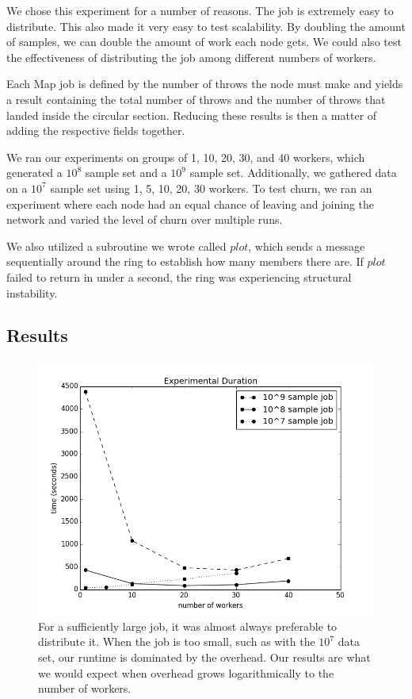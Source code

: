 \documentclass[10pt, conference, compsocconf]{IEEEtran}
\begin{document}
We chose this experiment for a number of reasons. The job is extremely easy to distribute.  This also made it very easy to test scalability. By doubling the amount of samples, we can double the amount of work each node gets.  We could also test the effectiveness of distributing the job among different numbers of workers.

Each Map job is defined by the number of throws the node must make and yields a result containing the total number of throws and the number of throws that landed inside the circular section.  Reducing these results is then a matter of adding the respective fields together. 



We ran our experiments on groups of 1, 10, 20, 30, and 40 workers, which generated a $10^{8}$ sample set and a $10^{9}$ sample set.  Additionally, we gathered data on a $10^{7}$ sample set using 1, 5, 10, 20, 30 workers.  To test churn, we ran an experiment where each node had an equal chance of leaving and joining the network and varied the level of churn over multiple runs.  

We also utilized a subroutine we wrote called $plot$, which sends a message sequentially around the ring to establish how many members there are.  If $plot$ failed to return in under a second, the ring was experiencing structural instability.

\subsection{Results}

\begin{figure}
    \includegraphics[width=\linewidth]{expTime}
    \caption{For a sufficiently large job, it was almost always preferable to distribute it.  When the job is too small, such as with the $10^{7}$ data set, our runtime is dominated by the overhead.  Our results are what we would expect when overhead grows logarithmically to the number of workers.}
    \label{expTime}
\end{figure}
\end{document}
